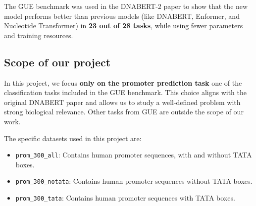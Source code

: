 The GUE benchmark was used in the DNABERT-2 paper to show that the new model performs better than previous models (like DNABERT, Enformer, and Nucleotide Transformer) in \textbf{23 out of 28 tasks}, while using fewer parameters and training resources.

\subsection{Scope of our project}

In this project, we focus \textbf{only on the promoter prediction task} one of the classification tasks included in the GUE benchmark. This choice aligns with the original DNABERT paper and allows us to study a well-defined problem with strong biological relevance. Other tasks from GUE are outside the scope of our work.

The specific datasets used in this project are:
\begin{itemize}
    \item \texttt{prom\_300\_all}: Contains human promoter sequences, with and without TATA boxes.
    \item \texttt{prom\_300\_notata}: Contains human promoter sequences without TATA boxes.
    \item \texttt{prom\_300\_tata}: Contains human promoter sequences with TATA boxes.
\end{itemize}
